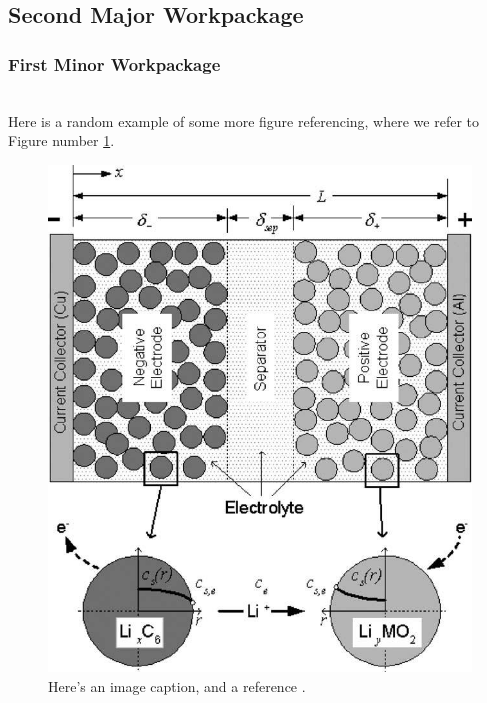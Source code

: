 \documentclass[pdftex,12pt,a4paper]{article}
\begin{document}
\subsection{Second Major Workpackage} \label{sec:Second Major Body of Work}

\subsubsection{First Minor Workpackage} \label{sec:Name for 1st subsection of work package 2}
\blindtext \\		%

Here is a random example of some more figure referencing, where we refer to Figure number \ref{fig:Smith_Wang_Battery_Model}. \\	%

\blindtext		%

\begin{figure}[h] 
	\centering
	\includegraphics[scale=0.45]{Images/Smith_Wang_Battery_Model}
	\caption{Here's an image caption, and a reference \cite{Goodenough2013a}.}
	\label{fig:Smith_Wang_Battery_Model}
\end{figure}
\end{document}
